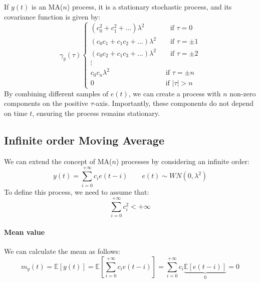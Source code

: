 If $y(t)$ is an MA($n$) process, it is a stationary stochastic process, and its covariance function is given by:
\[\gamma_y(\tau)\begin{cases}
    \left(c_0^2+c_1^2+\dots\right)\lambda^2 \qquad\quad\:\:\: \text{if }\tau = 0 \\
    \left(c_0c_1+c_1c_2+\dots\right)\lambda^2 \qquad \text{if }\tau = \pm 1 \\
    \left(c_0c_2+c_1c_3+\dots\right)\lambda^2 \qquad \text{if }\tau = \pm 2\\
    \vdots \\
    c_0c_n\lambda^2 \qquad\qquad\qquad\qquad \text{if }\tau = \pm n\\
    0 \qquad\qquad\qquad\qquad\qquad\: \text{if }\left\lvert \tau\right\rvert >n
\end{cases}\]
By combining different samples of $e(t)$, we can create a process with $n$ non-zero components on the positive $\tau$-axis. 
Importantly, these components do not depend on time $t$, ensuring the process remains stationary.

\subsection{Infinite order Moving Average}
We can extend the concept of MA($n$) processes by considering an infinite order:
\[y(t)=\sum_{i=0}^{+\infty}c_ie(t-i)\qquad e(t)\sim WN(0,\lambda^2)\]
To define this process, we need to assume that:
\[\sum_{i=0}^{+\infty}c_i^2<+\infty\]

\paragraph*{Mean value}
We can calculate the mean as follows:
\[m_y(t)=\mathbb{E}\left[y(t)\right]=\mathbb{E}\left[\sum_{i=0}^{+\infty}c_ie(t-i)\right]=\sum_{i=0}^{+\infty}c_i\underbrace{\mathbb{E}\left[e(t-i)\right]}_0=0\]

